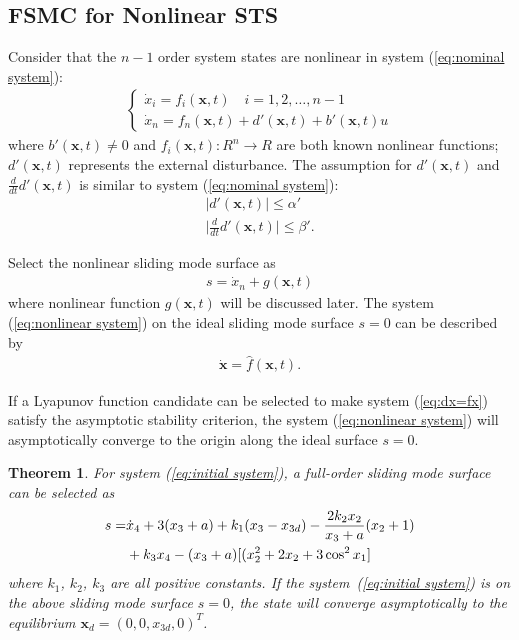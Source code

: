 \documentclass[conference]{IEEEtran}
\theoremstyle{plain}
\newtheorem{mythm}{Theorem}
\begin{document}
\subsection{FSMC for Nonlinear STS}\label{sec:nonlinear control law}
Consider that the $n-1$ order system states are nonlinear in system (\ref{eq:nominal system}):
\begin{align}
\begin{cases}
\dot x_i = f_i(\bm{x},t)\quad i = 1,2,\ldots,n-1\\
\dot x_n = f_n(\bm{x},t)+d'(\bm{x},t)+b'(\bm{x},t)u\label{eq:nonlinear system}
\end{cases}
\end{align}
where $b'(\bm{x},t)\neq 0$ and $f_i(\bm{x},t):R^n\rightarrow R$ are both known nonlinear functions; $d'(\bm{x},t)$ represents the external disturbance. The assumption for $d'(\bm{x},t)$ and $\frac{d}{dt} d'(\bm{x},t)$ is similar to system (\ref{eq:nominal system}):
\begin{align}
\vert d'(\bm{x},t)\vert \le \alpha'\\
\vert \frac{d}{dt} d'(\bm{x},t)\vert \le\beta'.
\end{align}\par
Select the nonlinear sliding mode surface as
\begin{align}
s = \dot x_n + g(\bm{x},t)\label{eq:nonlinear surface}
\end{align}
where nonlinear function $g(\bm{x},t)$ will be discussed later. The system (\ref{eq:nonlinear system}) on the ideal sliding mode surface $s=0$ can be described by
\begin{align}
\dot {\bm{x}} = \hat f(\bm{x},t).\label{eq:dx=fx}
\end{align}\par
If a Lyapunov function candidate can be selected to make system (\ref{eq:dx=fx}) satisfy the asymptotic stability criterion, the system (\ref{eq:nonlinear system}) will asymptotically converge to the origin along the ideal surface $s=0$.
\begin{mythm}\label{eq:thm:2}
For system (\ref{eq:initial system}), a full-order sliding mode surface can be selected as
\begin{align}
s =& \dot x_4+3(x_3+a)+k_1(x_3-x_{3d})-\frac{2k_2x_2}{x_3+a}(x_2+1) \notag\\
&+ k_3x_4- (x_3 +a)[(x_2^2+2x_2+3\cos^2{x_1}]\label{eq:lypunov sliding mode}
\end{align}
where $k_1$, $k_2$, $k_3$ are all positive constants. If the system~(\ref{eq:initial system}) is on the above sliding mode surface $s=0$, the state will converge asymptotically to the equilibrium $\bm{x}_d=(0,0,x_{3d},0)^T$.
\end{mythm}
\end{document}
